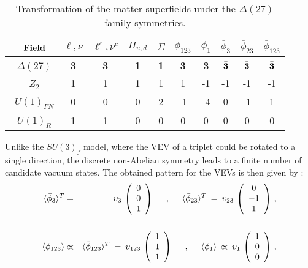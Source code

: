 \documentclass[a4paper,11pt]{article}
\newcommand{\bea}{\begin{eqnarray}}
\newcommand{\eea}{\end{eqnarray}}
\newcommand{\nn}{\nonumber}
\begin{document}
\begin{table}[h!]
\centering 
\begin{tabular}{|c||c|c||c|c||c|c|c|c|c|}
\hline
~${\bf Field}$ & $\ell, \nu$ & $\ell^c,\nu^c$ & $H_{u,d}$ & $\Sigma$ &
$\phi_{123}$ & $\phi_1$ & $\bar\phi_3$ & $\bar\phi_{23}$ & $\bar\phi_{123}$\\ 
\hline
\hline
~$\Delta(27)$           & \bf 3         & \bf 3         & \bf 1 & \bf 1             & \bf 3 & \bf 3 & $\bar{\bf 3}$ & $\bar{\bf 3}$ & $\bar{\bf 3}$  \\
~$Z_2$    & 1 & 1 & 1 & 1 & 1 & -1 & -1 & -1 & -1 \\
~$U(1)_{FN}$    & 0    & 0  & 0 & 2  & -1 & -4 & 0 & -1 & 1 \\
~$U(1)_R$     & 1         & 1         & 0 & 0 & 0 & 0 & 0 & 0 & 0 \\ 
\hline
\end{tabular}
\caption{Transformation of the matter superfields under the $\Delta(27)$ family symmetries.}
\label{tab:D27pc}
\end{table}

Unlike the $SU(3)_f$ model, where the VEV of a triplet could be rotated to a single direction, the discrete non-Abelian symmetry leads to a finite number of candidate vacuum states. The obtained pattern for the VEVs is then given by \cite{deMedeirosVarzielas:2006fc}:
\bea
 \langle \bar\phi_3 \rangle^T & = &  \upsilon_3\,\left(\begin{array}{c} 0\\ 0\\ 1\end{array}\right)\hspace{.5cm},\hspace{.5cm}
 \langle \bar\phi_{23} \rangle^T \:=\:  \upsilon_{23}\,\left(\begin{array}{c} 0\\ -1\\ 1\end{array}\right) \,,\\
 \nn \\
 \langle \phi_{123} \rangle & \propto & \langle \bar\phi_{123} \rangle^T \:=\: 
  \upsilon_{123}\,\left(\begin{array}{c} 1\\ 1\\ 1 \end{array}\right) \hspace{.5cm},\hspace{.5cm} \langle \phi_1 \rangle \: 
 \propto \:  \upsilon_1\,\left(\begin{array}{c} 1\\ 0\\ 0 \end{array}\right)\,,
\eea
\end{document}

